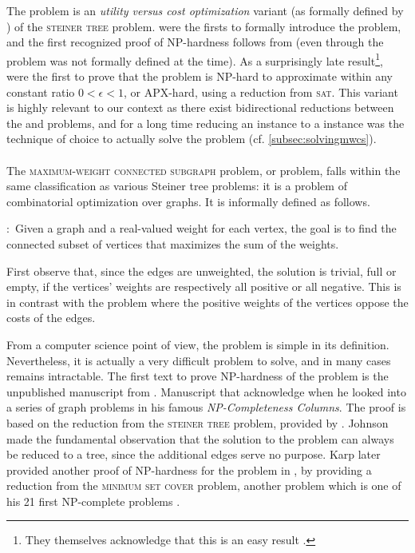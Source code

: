	The \pcst{} problem is an \emph{utility versus cost optimization} variant (as formally defined by \textcite{conrad2007connections}) of the \textsc{steiner tree} problem.
	\Textcite{bienstock1993note} were the firsts to formally introduce the problem, and the first recognized proof of NP-hardness follows from \textcite{camerini1979complexity} (even through the problem was not formally defined at the time).
	As a surprisingly late result\footnote{They themselves acknowledge that this is an easy result \parencite[footnote 12]{feigenbaum2000sharing}.}, \textcite{feigenbaum2000sharing} were the first to prove that the \pcst{} problem is NP-hard to approximate within any constant ratio $0 < \epsilon < 1$, or APX-hard, using a reduction from \textsc{sat}.
	This variant is highly relevant to our context as there exist bidirectional reductions between the \pcst{} and \mwcs{} problems, and for a long time reducing an \mwcs{} instance to a \pcst{} instance was the technique of choice to actually solve the problem (cf. \cref{subsec:solvingmwcs}).

	\paragraph{}
	The \textsc{maximum-weight connected subgraph} problem, or \mwcs{} problem, falls within the same classification as various Steiner tree problems: it is a problem of combinatorial optimization over graphs.
	It is informally defined as follows.

	\textbf{\mwcs{}$\colon$} Given a graph and a real-valued weight for each vertex, the goal is to find the connected subset of vertices that maximizes the sum of the weights.

	First observe that, since the edges are unweighted, the solution is trivial, full or empty, if the vertices' weights are respectively all positive or all negative.
	This is in contrast with the \pcst{} problem where the positive weights of the vertices oppose the costs of the edges.

	From a computer science point of view, the \mwcs{} problem is simple in its definition.
	Nevertheless, it is actually a very difficult problem to solve, and in many cases remains intractable.
	The first text to prove NP-hardness of the problem is the unpublished manuscript from \textcite{vergis1983manuscript}.
	Manuscript that \textcite[Section 5]{johnson1985np} acknowledge when he looked into a series of graph problems in his famous \emph{NP-Completeness Columns}.
	The proof is based on the reduction from the \textsc{steiner tree} problem, provided by \textcite{garey1979computers}.
	Johnson made the fundamental observation that the solution to the \mwcs{} problem can always be reduced to a tree, since the additional edges serve no purpose.
	Karp later provided another proof of NP-hardness for the \mwcs{} problem in \parencite[Supplementary Material]{ideker2002discovering}, by providing a reduction from the \textsc{minimum set cover} problem, another problem which is one of his 21 first NP-complete problems \parencite{karp1972reducibility}.


